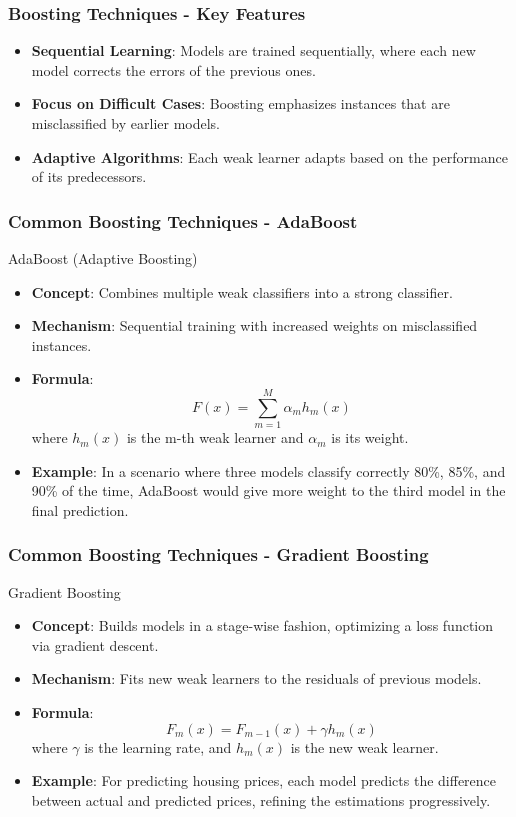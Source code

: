 \documentclass[aspectratio=169]{beamer}
\begin{document}
\begin{frame}[fragile]
  \frametitle{Boosting Techniques - Key Features}
  \begin{itemize}
    \item \textbf{Sequential Learning}: Models are trained sequentially, where each new model corrects the errors of the previous ones.
    \item \textbf{Focus on Difficult Cases}: Boosting emphasizes instances that are misclassified by earlier models.
    \item \textbf{Adaptive Algorithms}: Each weak learner adapts based on the performance of its predecessors.
  \end{itemize}
\end{frame}

\begin{frame}[fragile]
  \frametitle{Common Boosting Techniques - AdaBoost}
  \begin{block}{AdaBoost (Adaptive Boosting)}
    \begin{itemize}
      \item \textbf{Concept}: Combines multiple weak classifiers into a strong classifier.
      \item \textbf{Mechanism}: Sequential training with increased weights on misclassified instances.
      \item \textbf{Formula}:
      \begin{equation}
        F(x) = \sum_{m=1}^{M} \alpha_m h_m(x)
      \end{equation}
      where \( h_m(x) \) is the m-th weak learner and \( \alpha_m \) is its weight.
      \item \textbf{Example}: In a scenario where three models classify correctly 80\%, 85\%, and 90\% of the time, AdaBoost would give more weight to the third model in the final prediction.
    \end{itemize}
  \end{block}
\end{frame}

\begin{frame}[fragile]
  \frametitle{Common Boosting Techniques - Gradient Boosting}
  \begin{block}{Gradient Boosting}
    \begin{itemize}
      \item \textbf{Concept}: Builds models in a stage-wise fashion, optimizing a loss function via gradient descent.
      \item \textbf{Mechanism}: Fits new weak learners to the residuals of previous models.
      \item \textbf{Formula}:
      \begin{equation}
        F_{m}(x) = F_{m-1}(x) + \gamma h_m(x)
      \end{equation}
      where \( \gamma \) is the learning rate, and \( h_m(x) \) is the new weak learner.
      \item \textbf{Example}: For predicting housing prices, each model predicts the difference between actual and predicted prices, refining the estimations progressively.
    \end{itemize}
  \end{block}
\end{frame}
\end{document}
